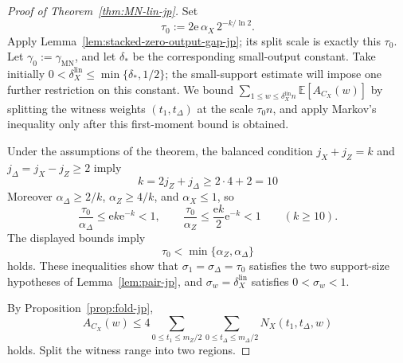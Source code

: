 \documentclass[11pt]{article}
\theoremstyle{definition}
\newcommand{\EE}{\mathbb E}
\newcommand{\CX}{C_X}
\newcommand{\NX}{N_X}
\begin{document}
\begin{proof}[Proof of Theorem~\ref{thm:MN-lin-jp}]
Set
\begin{equation*}
\tau_0:=2\mathrm{e}\,\alpha_X\,2^{-k/\ln 2}.
\end{equation*}
Apply Lemma~\ref{lem:stacked-zero-output-gap-jp}; its split scale is exactly this \(\tau_0\). Let \(\gamma_0:=\gamma_{\mathrm{MN}}\), and let \(\delta_*\) be the corresponding small-output constant.
Take initially \(0<\delta_X^{\mathrm{lin}}\le\min\{\delta_*,1/2\}\); the small-support estimate will impose one further restriction on this constant.
We bound \(\sum_{1\le w\le\delta_X^{\mathrm{lin}}n}\EE[A_{\CX}(w)]\) by splitting the witness weights \((t_1,t_\Delta)\) at the scale \(\tau_0 n\), and apply Markov's inequality only after this first-moment bound is obtained.

Under the assumptions of the theorem, the balanced condition \(j_X+j_Z=k\) and
\(j_\Delta=j_X-j_Z\ge 2\) imply
\begin{equation*}
k=2j_Z+j_\Delta\ge 2\cdot 4+2=10
\end{equation*}
Moreover \(\alpha_\Delta\ge2/k\), \(\alpha_Z\ge4/k\), and \(\alpha_X\le1\), so
\[
\frac{\tau_0}{\alpha_\Delta}\le \mathrm{e}k\mathrm{e}^{-k}<1,
\qquad
\frac{\tau_0}{\alpha_Z}\le \frac{\mathrm{e}k}{2}\mathrm{e}^{-k}<1
\qquad (k\ge10).
\]
The displayed bounds imply
\begin{equation*}
\tau_0<\min\{\alpha_Z,\alpha_\Delta\}
\end{equation*}
holds.
These inequalities show that \(\sigma_1=\sigma_\Delta=\tau_0\) satisfies the two support-size hypotheses of Lemma~\ref{lem:pair-jp}, and \(\sigma_w=\delta_X^{\mathrm{lin}}\) satisfies \(0<\sigma_w<1\).

By Proposition~\ref{prop:fold-jp},
\begin{equation*}
A_{\CX}(w)
\le
4\sum_{0\le t_1\le m_Z/2}\sum_{0\le t_\Delta\le m_\Delta/2}\NX(t_1,t_\Delta,w)
\end{equation*}
holds.
Split the witness range into two regions.


\end{proof}
\end{document}
